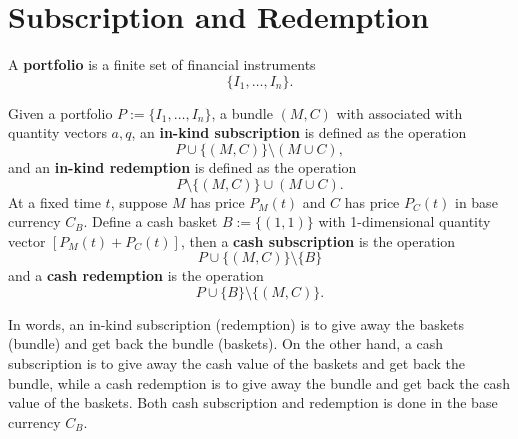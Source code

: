 \documentclass[11pt,fleqn]{book} %
\begin{document}

\section{Subscription and Redemption}

\begin{definition} \label{def:121}
A \textbf{portfolio} is a finite set of financial instruments
\[
\{I_1, \ldots, I_n\}.
\]
\end{definition}

\begin{definition} \label{def:122}
Given a portfolio \(P := \{I_1, \ldots, I_n\}\), a bundle \((M, C)\) with associated with quantity vectors \(a, q\), an \textbf{in-kind subscription} is defined as the operation
\[
P \cup \{(M, C)\} \setminus (M \cup C),
\]
and an \textbf{in-kind redemption} is defined as the operation
\[
P \setminus \{(M, C)\} \cup (M \cup C).
\]
\indent At a fixed time \(t\), suppose \(M\) has price \(P_M(t)\) and \(C\) has price \(P_C(t)\) in base currency
\(C_B\). Define a cash basket \(B := \{(1, 1)\}\) with 1-dimensional quantity vector \([P_M(t) + P_C(t)]\), then a \textbf{cash subscription} is the operation
\[
P \cup \{(M, C)\} \setminus \{B\}
\]
and a \textbf{cash redemption} is the operation
\[
P \cup \{B\} \setminus \{(M, C)\}.
\]
\end{definition}

\begin{remark} \label{rmk:123}
In words, an in-kind subscription (redemption) is to give away the baskets (bundle) and get back the bundle
(baskets). On the other hand, a cash subscription is to give away the cash value of the baskets and get back the
bundle, while a cash redemption is to give away the bundle and get back the cash value of the baskets. Both cash
subscription and redemption is done in the base currency \(C_B\).
\end{remark}





\end{document}
